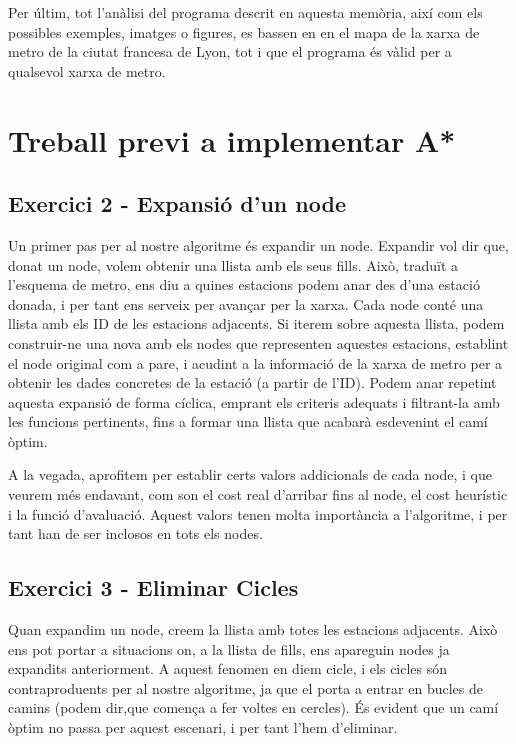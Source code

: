 \documentclass[a4paper,12pt]{article}
\begin{document}
        Per últim, tot l’anàlisi del programa descrit en aquesta memòria, així com els possibles exemples, imatges o figures, es bassen en en el mapa de la xarxa de metro de la ciutat francesa de Lyon, tot i que el programa és vàlid per a qualsevol xarxa de metro.


    \pagebreak

    \section*{Treball previ a implementar A*}

        \subsection*{Exercici 2 - Expansió d’un node}

            Un primer pas per al nostre algoritme és expandir un node. Expandir vol dir que, donat un node, volem obtenir una llista amb els seus fills. Això, traduït a l’esquema de metro, ens diu a quines estacions podem anar des d’una estació donada, i per tant ens serveix per avançar per la xarxa.
            Cada node conté una llista amb els ID de les estacions adjacents. Si iterem sobre aquesta llista, podem construir-ne una nova amb els nodes que representen aquestes estacions, establint el node original com a pare, i acudint a la informació de la xarxa de metro per a obtenir les dades concretes de la estació (a partir de l’ID).
            Podem anar repetint aquesta expansió de forma cíclica, emprant els criteris adequats i filtrant-la amb les funcions pertinents, fins a formar una llista que acabarà esdevenint el camí òptim.

            A la vegada, aprofitem per establir certs valors addicionals de cada node, i que veurem més endavant, com son el cost real d’arribar fins al node, el cost heurístic i la funció d'avaluació. Aquest valors tenen molta importància a l’algoritme, i per tant han de ser inclosos en tots els nodes.


        \subsection*{Exercici 3 - Eliminar Cicles}

            Quan expandim un node, creem la llista amb totes les estacions adjacents. Això ens pot portar a situacions on, a la llista de fills, ens apareguin nodes ja expandits anteriorment. A aquest fenomen en diem cicle, i els cicles són contraproduents per al nostre algoritme, ja que el porta a entrar en bucles de camins (podem dir,que comença a fer voltes en cercles). És evident que un camí òptim no passa per aquest escenari, i per tant l’hem d’eliminar.
\end{document}
